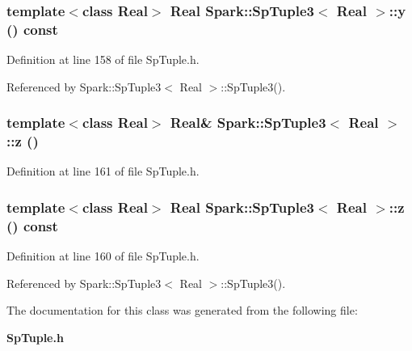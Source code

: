 \subsubsection{\setlength{\rightskip}{0pt plus 5cm}template$<$class Real$>$ Real {\bf Spark::Sp\-Tuple3}$<$ Real $>$::y () const\hspace{0.3cm}{\tt  [inline]}}\label{classSpark_1_1SpTuple3_a4}


Definition at line 158 of file Sp\-Tuple.h.

Referenced by Spark::Sp\-Tuple3$<$ Real $>$::Sp\-Tuple3().
\subsubsection{\setlength{\rightskip}{0pt plus 5cm}template$<$class Real$>$ Real\& {\bf Spark::Sp\-Tuple3}$<$ Real $>$::z ()\hspace{0.3cm}{\tt  [inline]}}\label{classSpark_1_1SpTuple3_a7}


Definition at line 161 of file Sp\-Tuple.h.
\subsubsection{\setlength{\rightskip}{0pt plus 5cm}template$<$class Real$>$ Real {\bf Spark::Sp\-Tuple3}$<$ Real $>$::z () const\hspace{0.3cm}{\tt  [inline]}}\label{classSpark_1_1SpTuple3_a6}


Definition at line 160 of file Sp\-Tuple.h.

Referenced by Spark::Sp\-Tuple3$<$ Real $>$::Sp\-Tuple3().

The documentation for this class was generated from the following file:\begin{CompactItemize}
\item 
{\bf Sp\-Tuple.h}\end{CompactItemize}
